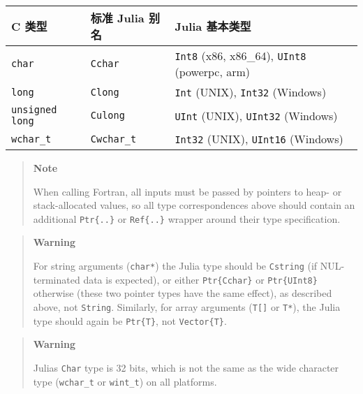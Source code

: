 \begin{table}[h]

\begin{tabulary}{\linewidth}{|L|L|L|}
\hline
C 类型 & 标准 Julia 别名 & Julia 基本类型 \\
\hline
\texttt{char} & \texttt{Cchar} & \texttt{Int8} (x86, x86\_64), \texttt{UInt8} (powerpc, arm) \\
\hline
\texttt{long} & \texttt{Clong} & \texttt{Int} (UNIX), \texttt{Int32} (Windows) \\
\hline
\texttt{unsigned long} & \texttt{Culong} & \texttt{UInt} (UNIX), \texttt{UInt32} (Windows) \\
\hline
\texttt{wchar\_t} & \texttt{Cwchar\_t} & \texttt{Int32} (UNIX), \texttt{UInt16} (Windows) \\
\hline
\end{tabulary}

\end{table}



\begin{quote}
\textbf{Note}

When calling Fortran, all inputs must be passed by pointers to heap- or stack-allocated values, so all type correspondences above should contain an additional \texttt{Ptr\{..\}} or \texttt{Ref\{..\}} wrapper around their type specification.

\end{quote}


\begin{quote}
\textbf{Warning}

For string arguments (\texttt{char*}) the Julia type should be \texttt{Cstring} (if NUL- terminated data is expected), or either \texttt{Ptr\{Cchar\}} or \texttt{Ptr\{UInt8\}} otherwise (these two pointer types have the same effect), as described above, not \texttt{String}. Similarly, for array arguments (\texttt{T[]} or \texttt{T*}), the Julia type should again be \texttt{Ptr\{T\}}, not \texttt{Vector\{T\}}.

\end{quote}


\begin{quote}
\textbf{Warning}

Julia{\textquotesingle}s \texttt{Char} type is 32 bits, which is not the same as the wide character type (\texttt{wchar\_t} or \texttt{wint\_t}) on all platforms.

\end{quote}


